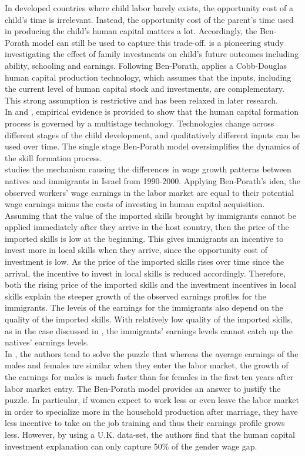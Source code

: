 \indent In developed countries where child labor barely exists, the opportunity cost of a child's time is irrelevant. Instead, the opportunity cost of the parent's time used in producing the child's human capital matters a lot. Accordingly, the Ben-Porath model can still be used to capture this trade-off. \citet{leibowitz1974home} is a pioneering study investigating the effect of family investments on child's future outcomes including ability, schooling and earnings. Following Ben-Porath, \citet{leibowitz1974home} applies a Cobb-Douglas human capital production technology, which assumes that the inputs, including the current level of human capital stock and investments, are complementary. This strong assumption is restrictive and has been relaxed in later research. \\
\indent In \citet{cunha2007technology} and \citet{cunha2010estimating}, empirical evidence is provided to show that the human capital formation process is governed by a multistage technology. Technologies change across different stages of the child development, and qualitatively different inputs can be used over time. The single stage Ben-Porath model oversimplifies the dynamics of the skill formation process.\\
\indent \citet{eckstein2004wage} studies the mechanism causing the differences in wage growth patterns between natives and immigrants in Israel from 1990-2000. Applying Ben-Porath's idea, the observed workers' wage earnings in the labor market are equal to their potential wage earnings minus the costs of investing in human capital acquisition. Assuming that the value of the imported skills brought by immigrants cannot be applied immediately after they arrive in the host country, then the price of the imported skills is  low at the beginning. This gives immigrants an incentive to invest more in local skills when they arrive, since the opportunity cost of investment is low. As the price of the imported skills rises over time since the arrival, the incentive to invest in local skills is reduced accordingly. Therefore, both the rising price of the imported skills and the investment incentives in local skills explain the steeper growth of the observed earnings profiles for the immigrants. The levels of the earnings for the immigrants also depend on the quality of the imported skills. With relatively low quality of the imported skills, as in the case discussed in \citet{eckstein2004wage}, the immigrants' earnings levels cannot catch up the natives' earnings levels.\\
\indent In \citet{manning2008gender}, the authors tend to solve the puzzle that whereas the average earnings of the males and females are similar when they enter the labor market, the growth of the earnings for males is much faster than for females in the first ten years after labor market entry. The Ben-Porath model provides an answer to justify the puzzle. In particular, if women expect to work less or even leave the labor market in order to specialize more in the household production after marriage, they have less incentive to take on the job training and thus their earnings profile grows less. However, by using a U.K. data-set, the authors find that the human capital investment explanation can only capture 50\% of the gender wage gap.\\
